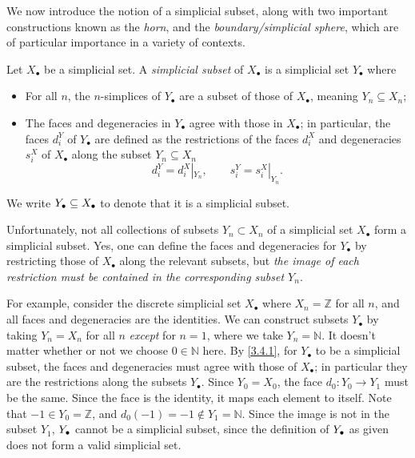 We now introduce the notion of a simplicial subset, along with two important constructions known as the \emph{horn}, and the \emph{boundary/simplicial sphere}, which are of particular importance in a variety of contexts.

\begin{definition}\label{3.4.1}
    Let $X_\bullet$ be a simplicial set. A \emph{simplicial subset} of $X_\bullet$ is a simplicial set $Y_\bullet$ where
    \begin{itemize}
        \item For all $n$, the $n$-simplices of $Y_\bullet$ are a subset of those of $X_\bullet$, meaning $Y_n\subseteq X_n$;
        \item The faces and degeneracies in $Y_\bullet$ agree with those in $X_\bullet$; in particular, the faces $d_i^Y$ of $Y_\bullet$ are defined as the restrictions of the faces $d_i^X$ and degeneracies $s_i^X$ of $X_\bullet$ along the subset $Y_n\subseteq X_n$
        \[
        d_i^Y = d_i^X|_{Y_n}, \qquad s_i^Y = s_i^X|_{Y_n}.
        \]
    \end{itemize}
    We write $Y_\bullet\subseteq X_\bullet$ to denote that it is a simplicial subset.
\end{definition}

\begin{remark}\label{3.4.2}
    Unfortunately, not all collections of subsets $Y_n\subset X_n$ of a simplicial set $X_\bullet$ form a simplicial subset. Yes, one can define the faces and degeneracies for $Y_\bullet$ by restricting those of $X_\bullet$ along the relevant subsets, but \emph{the image of each restriction must be contained in the corresponding subset $Y_n$}.
    
    For example, consider the discrete simplicial set $X_\bullet$ where $X_n=\mathbb{Z}$ for all $n$, and all faces and degeneracies are the identities. We can construct subsets $Y_\bullet$ by taking $Y_n=X_n$ for all $n$ \emph{except} for $n=1$, where we take $Y_n=\mathbb{N}$. It doesn't matter whether or not we choose $0\in\mathbb{N}$ here. By \cref{3.4.1}, for $Y_\bullet$ to be a simplicial subset, the faces and degeneracies must agree with those of $X_\bullet$; in particular they are the restrictions along the subsets $Y_\bullet$. Since $Y_0=X_0$, the face $d_0 : Y_0 \to Y_1$ must be the same. Since the face is the identity, it maps each element to itself. Note that $-1\in Y_0=\mathbb{Z}$, and $d_0(-1)=-1\notin Y_1=\mathbb{N}$. Since the image is not in the subset $Y_1$, $Y_\bullet$ cannot be a simplicial subset, since the definition of $Y_\bullet$ as given does not form a valid simplicial set.
\end{remark}

